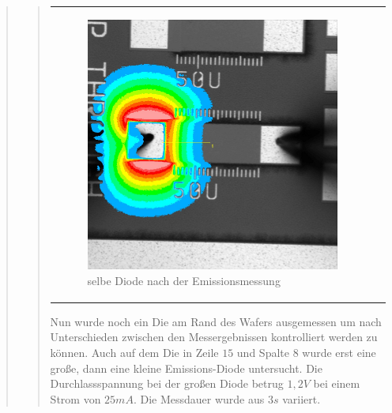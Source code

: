 \begin{quote}
\begin{quote}
\begin{center}
\begin{tabular}{ll}
\begin{minipage}{0.6\textwidth}
                         \begin{figure}[H]
                            \label{fig:}
                            \includegraphics[scale=0.25, trim = 0cm 0cm 0cm
                            0cm,
                            clip]{./Emissionsbilder/zwei/nach_Emissionsmessung_Intensitat_Distanz.jpg}
                            \caption{selbe Diode nach der Emissionsmessung}
                        \end{figure}
                   \vspace{-1.5em}
    
                    \end{minipage}
    
                \end{tabular}
                \end{center}
                
        \vspace{2em}
        
        Nun wurde noch ein Die am Rand des Wafers ausgemessen um nach
        Unterschieden zwischen den Messergebnissen kontrolliert werden zu
        können. Auch auf dem Die in Zeile $15$ und Spalte $8$ wurde erst eine
        große, dann eine kleine Emissions-Diode untersucht. Die Durchlassspannung bei der
        großen Diode betrug $1,2 V$ bei einem Strom von $25 mA$. Die Messdauer
        wurde aus $3s$ variiert.
        

\end{quote}
\end{quote}

